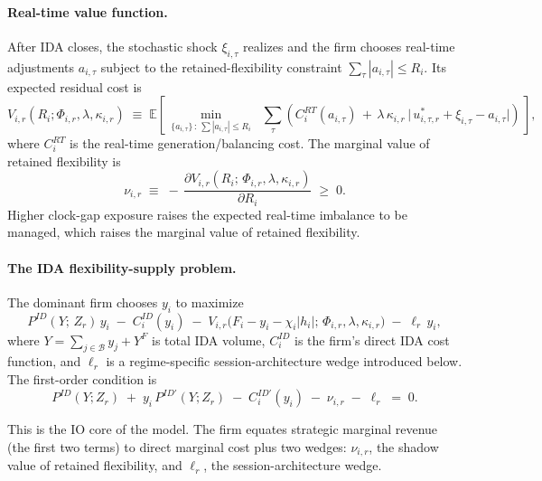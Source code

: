 \documentclass[11pt]{article}
\begin{document}
\paragraph{Real-time value function.} After IDA closes, the stochastic shock $\xi_{i,\tau}$ realizes and the firm chooses real-time adjustments $a_{i,\tau}$ subject to the retained-flexibility constraint $\sum_{\tau}|a_{i,\tau}| \le R_{i}$. Its expected residual cost is
\begin{equation}
V_{i,r}(R_{i}; \Phi_{i,r}, \lambda, \kappa_{i,r})
\;\equiv\; \mathbb{E}\!\left[\, \min_{\{a_{i,\tau}\}\,:\,\sum|a_{i,\tau}| \le R_{i}}
\;\;\sum_{\tau}\!\left( C^{RT}_{i}(a_{i,\tau}) \,+\, \lambda\,\kappa_{i,r}\,\big|\,u^{*}_{i,\tau,r} + \xi_{i,\tau} - a_{i,\tau}\big| \right) \,\right],
\label{eq:vfunction}
\end{equation}
where $C^{RT}_{i}$ is the real-time generation/balancing cost. The marginal value of retained flexibility is
\begin{equation}
\nu_{i,r} \;\equiv\; -\,\frac{\partial V_{i,r}(R_{i};\,\Phi_{i,r},\lambda,\kappa_{i,r})}{\partial R_{i}} \;\ge\; 0.
\label{eq:nu}
\end{equation}
Higher clock-gap exposure raises the expected real-time imbalance to be managed, which raises the marginal value of retained flexibility.

\paragraph{The IDA flexibility-supply problem.} The dominant firm chooses $y_{i}$ to maximize
\begin{equation}
P^{ID}(Y;\, Z_{r})\,y_{i} \;-\; C^{ID}_{i}(y_{i}) \;-\; V_{i,r}\!\big(F_{i} - y_{i} - \chi_{i}|h_{i}|;\, \Phi_{i,r}, \lambda, \kappa_{i,r}\big) \;-\; \ell_{r}\,y_{i},
\end{equation}
where $Y = \sum_{j \in \mathcal{B}} y_{j} + Y^{F}$ is total IDA volume, $C^{ID}_{i}$ is the firm's direct IDA cost function, and $\ell_{r}$ is a regime-specific session-architecture wedge introduced below. The first-order condition is
\begin{equation}
\boxed{\;\;
P^{ID}(Y;Z_{r}) \;+\; y_{i}\,P^{ID\prime}(Y;Z_{r}) \;-\; C^{ID\prime}_{i}(y_{i}) \;-\; \nu_{i,r} \;-\; \ell_{r} \;=\; 0.
\;\;}
\label{eq:foc}
\end{equation}

This is the IO core of the model. The firm equates strategic marginal revenue (the first two terms) to direct marginal cost plus two wedges: $\nu_{i,r}$, the shadow value of retained flexibility, and $\ell_{r}$, the session-architecture wedge.
\end{document}
